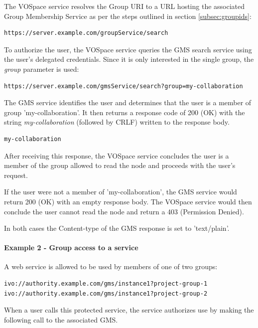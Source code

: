 \documentclass[11pt,a4paper]{ivoa}
\begin{document}
The VOSpace service resolves the Group URI to a URL hosting the associated Group Membership Service as per the steps outlined in section \ref{subsec:groupids}:

\begin{verbatim}
https://server.example.com/groupService/search
\end{verbatim}

To authorize the user, the VOSpace service queries the GMS search service using the user's delegated credentials.  Since it is only interested in the single group, the \emph{group} parameter is used:

\begin{verbatim}
https://server.example.com/gmsService/search?group=my-collaboration
\end{verbatim}

The GMS service identifies the user and determines that the user is a member of group 'my-collaboration'.  It then returns a response code of 200 (OK) with the string \emph{my-collaboration} (followed by CRLF) written to the response body.

\begin{verbatim}
my-collaboration
\end{verbatim}

After receiving this response, the VOSpace service concludes the user is a member of the group allowed to read the node and proceeds with the user's request.

If the user were not a member of 'my-collaboration', the GMS service would return 200 (OK) with an empty response body.  The VOSpace service would then conclude the user cannot read the node and return a 403 (Permission Denied).

In both cases the Content-type of the GMS response is set to 'text/plain'.

\paragraph{Example 2 - Group access to a service}

A web service is allowed to be used by members of one of two groups:

\begin{verbatim}
ivo://authority.example.com/gms/instance1?project-group-1
ivo://authority.example.com/gms/instance1?project-group-2
\end{verbatim}

When a user calls this protected service, the service authorizes use by making the following call to the associated GMS.
\end{document}

